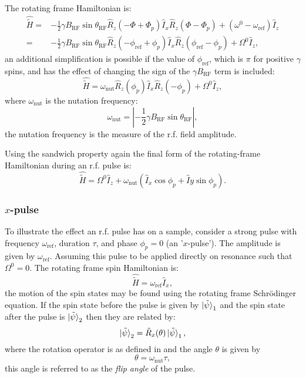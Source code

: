 The rotating frame Hamiltonian is:
\begin{align}
  \hat{\tilde{H}} =& -\frac{1}{2}\gamma{B_{\text{RF}}}\sin{\theta_{\text{RF}}}\hat{R}_z(-\Phi  +  \Phi_p)\hat{I}_x\hat{R}_z(\Phi-\Phi_p) + (\omega^0 - \omega_\text{ref})\hat{I}_z \\
  =& -\frac{1}{2}\gamma{B_{\text{RF}}}\sin{\theta_{\text{RF}}}\hat{R}_z(-\phi_{\text{ref}}  +  \phi_p)\hat{I}_x\hat{R}_z(\phi_{\text{ref}}-\phi_p) + \Omega^0\hat{I}_z,
\end{align}
an additional simplification is possible if the value of $\phi_{\text{ref}}$, which is
$\pi$ for positive $\gamma$ spins, and has the effect of changing the sign of the $\gamma{B_{\text{RF}}}$
term is included:
\begin{equation}
  \hat{\tilde{H}} = \omega_{\text{nut}}\hat{R}_z(\phi_p)\hat{I}_x\hat{R}_z(-\phi_p) + \Omega^0\hat{I}_z,
\end{equation}
where $\omega_{\text{nut}}$ is the nutation frequency:
\begin{equation}
  \omega_{\text{nut}} = |-\frac{1}{2}\gamma{B_{\text{RF}}}\sin{\theta_{\text{RF}}}|,
\end{equation}
the nutation frequency is the measure of the r.f. field amplitude.

Using the sandwich property again the final form of the rotating-frame Hamiltonian during an r.f. pulse
is:
\begin{equation}
  \hat{\tilde{H}} = \Omega^0\hat{I}_z + \omega_{\text{nut}}(\hat{I}_x\cos\phi_p + \hat{I}y\sin\phi_p).
\end{equation}


\subsubsection{$x$-pulse}

To illustrate the effect an r.f. pulse has on a sample, consider a strong
pulse with frequency $\omega_\text{ref}$, duration $\tau$, and phase $\phi_p = 0$ (an '$x$-pulse').
The amplitude is given by $\omega_\text{ref}$. Assuming this pulse to be applied
directly on resonance such that $\Omega^0 = 0$.
The rotating frame spin Hamiltonian is:
\begin{equation}
  \hat{\tilde{H}} = \omega_{\text{ref}}\hat{I}_x,
\end{equation}
the motion of the spin states may be found using the rotating frame Schr\"odinger equation. If the
spin state before the pulse is given by $\ket{\tilde{\psi}}_1$ and the spin state after the pulse
is $\ket{\tilde{\psi}}_2$ then they are related by:
\begin{equation}
  \ket{\tilde{\psi}}_2 = \hat{R}_x(\theta)\ket{\tilde{\psi}}_1,
\end{equation}
where the rotation operator is as defined in  and the angle
$\theta$ is given by
\begin{equation}
  \theta = \omega_\text{nut}\tau,
\end{equation}
this angle is referred to as the \textit{flip angle} of the pulse.

